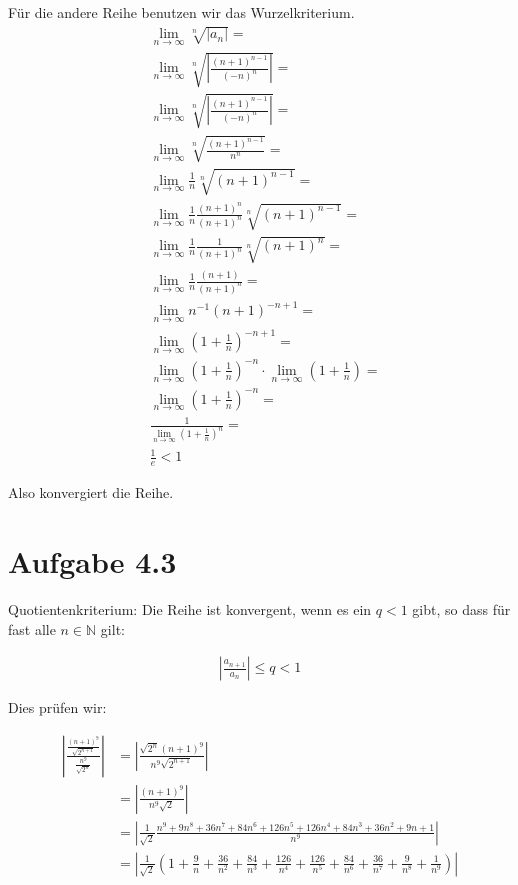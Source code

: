 \documentclass[a4paper,german,12pt,smallheadings]{scrartcl}
\begin{document}
Für die andere Reihe benutzen wir das Wurzelkriterium.
\begin{align*}
  &\lim_{n \to \infty} \sqrt[n]{\left| a_n \right|} =\\
  &\lim_{n \to \infty} \sqrt[n]{\left| \frac{(n+1)^{n-1}}{(-n)^n} \right|} =\\
  &\lim_{n \to \infty} \sqrt[n]{\left| \frac{(n+1)^{n-1}}{(-n)^n} \right|} =\\
  &\lim_{n \to \infty} \sqrt[n]{\frac{(n+1)^{n-1}}{n^n}} =\\
  &\lim_{n \to \infty} \frac{1}{n} \sqrt[n]{(n+1)^{n-1}} =\\
  &\lim_{n \to \infty} \frac{1}{n} \frac{(n+1)^n}{(n+1)^n} \sqrt[n]{(n+1)^{n-1}} =\\
  &\lim_{n \to \infty} \frac{1}{n} \frac{1}{(n+1)^n} \sqrt[n]{(n+1)^n} =\\
  &\lim_{n \to \infty} \frac{1}{n} \frac{(n+1)}{(n+1)^n} =\\
  &\lim_{n \to \infty} n^{-1} (n+1)^{-n+1} =\\
  &\lim_{n \to \infty} \left(1+\frac{1}{n}\right)^{-n+1} =\\
  &\lim_{n \to \infty} \left(1+\frac{1}{n}\right)^{-n} \cdot \lim_{n \to \infty} (1+\frac{1}{n}) =\\
  &\lim_{n \to \infty} \left(1+\frac{1}{n}\right)^{-n}=\\
  &\frac{1}{\lim_{n \to \infty} \left(1+\frac{1}{n}\right)^{n}}=\\
  &\frac{1}{e} < 1
\end{align*}

Also konvergiert die Reihe.

\section*{Aufgabe 4.3}
Quotientenkriterium: Die Reihe ist konvergent, wenn es ein $q < 1$ gibt, so
dass für fast alle $n \in \mathbb{N}$ gilt:

\begin{align*}
  \left| \frac{a_{n+1}}{a_n} \right| \le q < 1
\end{align*}

Dies prüfen wir:

\begin{align*}
  \left| \frac{\frac{(n+1)^9}{\sqrt{2^{n+1}}}}{\frac{n^9}{\sqrt{2^n}}} \right| &= \left| \frac{\sqrt{2^n} (n+1)^9}{n^9 \sqrt{2^{n+1}}} \right| \\
  &= \left| \frac{(n+1)^9}{n^9 \sqrt{2}} \right| \\
  &= \left| \frac{1}{\sqrt{2}} \frac{n^9+9n^8+36n^7+84n^6+126n^5+126n^4+84n^3+36n^2+9n+1}{n^9} \right| \\
  &= \left| \frac{1}{\sqrt{2}} \left(1 + \frac{9}{n} + \frac{36}{n^2} + \frac{84}{n^3} + \frac{126}{n^4} + \frac{126}{n^5} + \frac{84}{n^6} + \frac{36}{n^7} + \frac{9}{n^8} + \frac{1}{n^9}\right) \right| \\
\end{align*}
\end{document}
